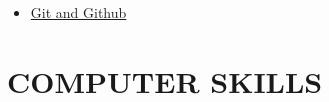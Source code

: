 \documentclass[10pt,a4paper,sans]{moderncv} %
\begin{document}
\begin{itemize}
\begin{multicols}{2}
\begin{itemize}
%				
%				
				
				\item  {\large{}} \href{https://www.udemy.com/git-complete/learn/v4/overview}{Git and Github}


				
			\end{itemize}
		\end{multicols}
		
		
	\end{itemize}
	
	\section{COMPUTER SKILLS}
	
\end{document}
